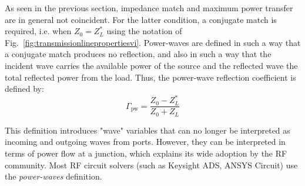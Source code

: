 As seen in the previous section, impedance match and maximum power transfer are in general not coincident. For the latter condition, a conjugate match is required, i.e. when $Z_0 = Z_L^*$ using the notation of Fig.~\ref{fig:transmissionlinepropertiesvi}. Power-waves are defined in such a way that a conjugate match produces no reflection, and also in such a way that the incident wave carries the available power of the source and the reflected wave the total reflected power from the load. Thus, the power-wave reflection coefficient is defined by:
\begin{equation}
	\Gamma_{\mathrm{pw}} = \frac{Z_0 - Z_L^*}{Z_0 + Z_L}
\end{equation}

This definition introduces "wave" variables that can no longer be interpreted as incoming and outgoing waves from ports. However, they can be interpreted in terms of power flow at a junction, which explains its wide adoption by the RF community. Most RF circuit solvers (such as Keysight ADS, ANSYS Circuit) use the \textit{power-waves} definition.  

